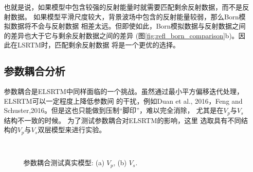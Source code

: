 也就是说，如果模型中包含较强的反射能量时就需要匹配剩余反射数据，而不是反射数据。
如果模型平滑尺度较大，背景波场中包含的反射能量较弱，那么Born模拟数据将不会与反射数据
相差太远。但即使如此，Born模拟数据与反射数据之间的差异也大于它与剩余反射数据之间的差异
(图\ref{fig:refl_born_comparison}b)。因此在LSRTM时，匹配剩余反射数据
将是一个更优的选择。
\subsection{参数耦合分析}
参数耦合是ELSRTM中同样面临的一个挑战。虽然通过最小平方偏移迭代处理，ELSRTM可以一定程度上降低参数间
的干扰，例如Duan et al., 2016\cite{Duan2016}，Feng and
Schuster,2016\cite{Feng2016}。但是这也只能做到压制“脚印”，难以完全消除，
尤其是在$V_p$与$V_s$结构不一致的时候。%
为了测试参数耦合对ELSRTM的影响，这里
选取具有不同结构的$V_p$与$V_s$双层模型来进行实验。
\begin{figure}[!htb]
   \centering
   \\
   \caption{参数耦合测试真实模型: (a) $V_p$, (b) $V_s$.}
   \label{fig:tradeoffModel}
\end{figure}
